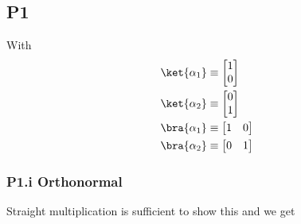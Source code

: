 \subsection{P1}

With
\begin{align*}
\ket{\alpha_1} &\equiv 
\begin{bmatrix}
1 \\
0
\end{bmatrix} \\
\ket{\alpha_2} &\equiv 
\begin{bmatrix}
0 \\
1
\end{bmatrix} \\
\bra{\alpha_1} &\equiv 
\begin{bmatrix}
1 & 0
\end{bmatrix} \\
\bra{\alpha_2} &\equiv 
\begin{bmatrix}
0 & 1
\end{bmatrix}
\end{align*}

\subsubsection{P1.i Orthonormal}

Straight multiplication is sufficient to show this and we get

